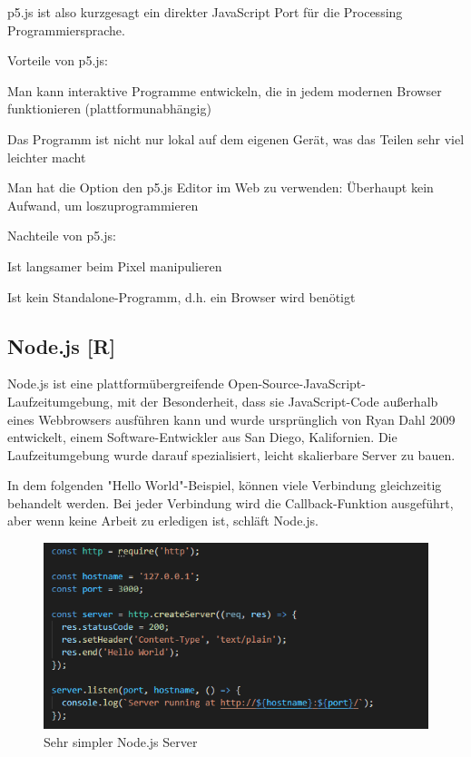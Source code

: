 p5.js ist also kurzgesagt ein direkter JavaScript Port für die Processing Programmiersprache. 

Vorteile von p5.js:
\begin{compactitem}
    \item Man kann interaktive Programme entwickeln, die in jedem modernen Browser funktionieren (plattformunabhängig)
    \item Das Programm ist nicht nur lokal auf dem eigenen Gerät, was das Teilen sehr viel leichter macht
    \item Man hat die Option den p5.js Editor im Web zu verwenden: Überhaupt kein Aufwand, um loszuprogrammieren
\end{compactitem}

Nachteile von p5.js:
\begin{compactitem}
    \item Ist langsamer beim Pixel manipulieren
    \item Ist kein Standalone-Programm, d.h. ein Browser wird benötigt
\end{compactitem}

\subsection {Node.js [R]}
Node.js ist eine plattformübergreifende Open-Source-JavaScript-Laufzeitumgebung, mit der Besonderheit, dass sie JavaScript-Code außerhalb eines Webbrowsers ausführen kann
und wurde ursprünglich von Ryan Dahl 2009 entwickelt, einem Software-Entwickler aus San Diego, Kalifornien. 
Die Laufzeitumgebung wurde darauf spezialisiert, leicht skalierbare Server zu bauen. 

In dem folgenden "Hello World"-Beispiel, können viele Verbindung gleichzeitig behandelt werden. Bei jeder Verbindung wird die Callback-Funktion ausgeführt, aber wenn keine Arbeit zu erledigen ist, schläft Node.js.

\begin{figure}[H]
    \centering
    \includegraphics[scale=1]{pics/node js.PNG}
    \caption{Sehr simpler Node.js Server}
\end{figure}

